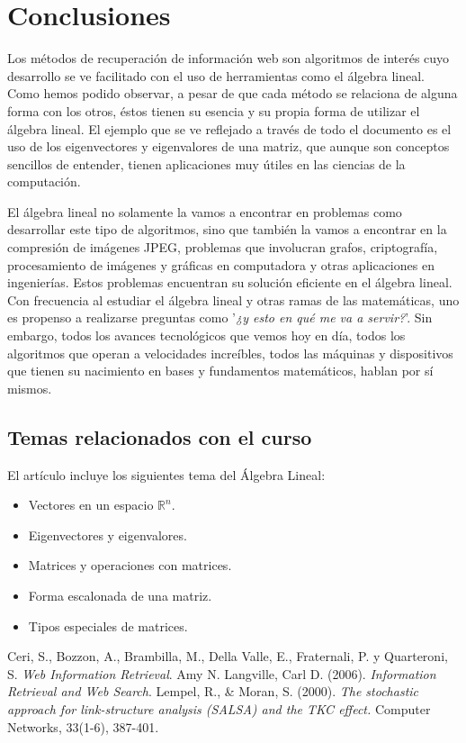 \documentclass[11pt]{article}
\begin{document}
\section{Conclusiones}
Los métodos de recuperación de información web son algoritmos de interés cuyo desarrollo se ve facilitado con el uso de herramientas como el álgebra lineal. Como hemos podido observar, a pesar de que cada método se relaciona de alguna forma con los otros, éstos tienen su esencia y su propia forma de utilizar el álgebra lineal. El ejemplo que se ve reflejado a través de todo el documento es el uso de los eigenvectores y eigenvalores de una matriz, que aunque son conceptos sencillos de entender, tienen aplicaciones muy útiles en las ciencias de la computación. \par \vspace{0.3cm}
El álgebra lineal no solamente la vamos a encontrar en problemas como desarrollar este tipo de algoritmos, sino que también la vamos a encontrar en la compresión de imágenes JPEG, problemas que involucran grafos, criptografía, procesamiento de imágenes y gráficas en computadora y otras aplicaciones en ingenierías. Estos problemas encuentran su solución eficiente en el álgebra lineal. Con frecuencia al estudiar el álgebra lineal y otras ramas de las matemáticas, uno es propenso a realizarse preguntas como '\textit{¿y esto en qué me va a servir?}'. Sin embargo, todos los avances tecnológicos que vemos hoy en día, todos los algoritmos que operan a velocidades increíbles, todos las máquinas y dispositivos que tienen su nacimiento en bases y fundamentos matemáticos, hablan por sí mismos. \newpage

\subsection{Temas relacionados con el curso}
El artículo incluye los siguientes tema del Álgebra Lineal:
\begin{itemize}
	\item Vectores en un espacio $\mathbb{R}^n$.
	\item Eigenvectores y eigenvalores.
	\item Matrices y operaciones con matrices.
	\item Forma escalonada de una matriz.
	\item Tipos especiales de matrices.
\end{itemize}

\begin{thebibliography}{}

 Ceri, S., Bozzon, A., Brambilla, M., Della Valle, E., Fraternali, P. y Quarteroni, S. \textit{Web Information Retrieval}.
  Amy N. Langville, Carl D. (2006). \textit{Information Retrieval and Web Search}.
 Lempel, R., \& Moran, S. (2000). \textit{The stochastic approach for link-structure analysis (SALSA) and the TKC effect.} Computer Networks, 33(1-6), 387-401.

\end{thebibliography}
\end{document}
